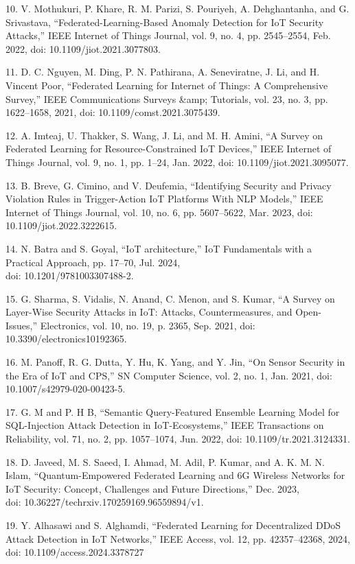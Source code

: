 \begin{noparindent}
10. V. Mothukuri, P. Khare, R. M. Parizi, S. Pouriyeh, A. Dehghantanha,
and G. Srivastava, ``Federated-Learning-Based Anomaly Detection for IoT
Security Attacks,'' IEEE Internet of Things Journal, vol. 9, no. 4, pp.
2545--2554, Feb. 2022, doi: 10.1109/jiot.2021.3077803.

11. D. C. Nguyen, M. Ding, P. N. Pathirana, A. Seneviratne, J. Li, and
H. Vincent Poor, ``Federated Learning for Internet of Things: A
Comprehensive Survey,'' IEEE Communications Surveys \&amp; Tutorials,
vol. 23, no. 3, pp. 1622--1658, 2021, doi: 10.1109/comst.2021.3075439.

12. A. Imteaj, U. Thakker, S. Wang, J. Li, and M. H. Amini, ``A Survey
on Federated Learning for Resource-Constrained IoT Devices,'' IEEE
Internet of Things Journal, vol. 9, no. 1, pp. 1--24, Jan. 2022, doi:
10.1109/jiot.2021.3095077.

13. B. Breve, G. Cimino, and V. Deufemia, ``Identifying Security and
Privacy Violation Rules in Trigger-Action IoT Platforms With NLP
Models,'' IEEE Internet of Things Journal, vol. 10, no. 6, pp.
5607--5622, Mar. 2023, doi: 10.1109/jiot.2022.3222615.

14. N. Batra and S. Goyal, ``IoT architecture,'' IoT Fundamentals with a
Practical Approach, pp. 17--70, Jul. 2024, \\doi: 10.1201/9781003307488-2.

15. G. Sharma, S. Vidalis, N. Anand, C. Menon, and S. Kumar, ``A Survey
on Layer-Wise Security Attacks in IoT: Attacks, Countermeasures, and
Open-Issues,'' Electronics, vol. 10, no. 19, p. 2365, Sep. 2021, doi:
10.3390/electronics10192365.

16. M. Panoff, R. G. Dutta, Y. Hu, K. Yang, and Y. Jin, ``On Sensor
Security in the Era of IoT and CPS,'' SN Computer Science, vol. 2, no.
1, Jan. 2021, doi: 10.1007/s42979-020-00423-5.

17. G. M and P. H B, ``Semantic Query-Featured Ensemble Learning Model
for SQL-Injection Attack Detection in IoT-Ecosystems,'' IEEE
Transactions on Reliability, vol. 71, no. 2, pp. 1057--1074, Jun. 2022,
doi: 10.1109/tr.2021.3124331.

18. D. Javeed, M. S. Saeed, I. Ahmad, M. Adil, P. Kumar, and A. K. M. N.
Islam, ``Quantum-Empowered Federated Learning and 6G Wireless Networks
for IoT Security: Concept, Challenges and Future Directions,'' Dec.
2023, \\doi: 10.36227/techrxiv.170259169.96559894/v1.

19. Y. Alhasawi and S. Alghamdi, ``Federated Learning for Decentralized
DDoS Attack Detection in IoT Networks,'' IEEE Access, vol. 12, pp.
42357--42368, 2024, doi: 10.1109/access.2024.3378727


\end{noparindent}
